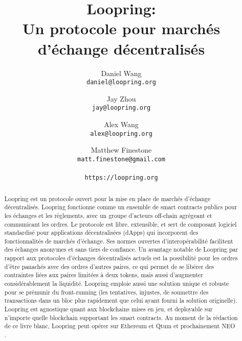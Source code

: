 \documentclass[UTF8,nofonts]{article}
\title{\textbf{Loopring:}\\\textbf{Un protocole pour marchés d'échange décentralisés}}
\author{
  Daniel Wang\\
  \texttt{daniel@loopring.org}\\
  \and
  	Jay Zhou\\
  	\texttt{jay@loopring.org}\\
  	\and
  	Alex Wang\\
  	\texttt{alex@loopring.org}\\
  	\and
  	Matthew Finestone\\
  	\texttt{matt.finestone@gmail.com}\\ 
  \\
  \texttt{https://loopring.org}
 }
\begin{document}
\maketitle


\begin{abstract}
Loopring est un protocole ouvert pour la mise en place de marchés d'échange décentralisés. Loopring fonctionne comme un ensemble de smart contracts publics pour les échanges et les règlements, avec un groupe d'acteurs off-chain agrégeant et communicant les ordres. Le protocole est libre, extensible, et sert de composant logiciel standardisé pour applications décentralisées (dApps) qui incorporent des fonctionnalités de marchés d'échange. Ses normes ouvertes d'interopérabilité facilitent des échanges anonymes et sans tiers de confiance. Un avantage notable de Loopring par rapport aux protocoles d'échanges décentralisés actuels est la possibilité pour les ordres d'être panachés avec des ordres d'autres paires, ce qui permet de se libérer des contraintes liées aux paires limitées à deux tokens, mais aussi d'augmenter considérablement la liquidité. Loopring emploie aussi une solution unique et robuste pour se prémunir du front-running (les tentatives, injustes, de soumettre des transactions dans un bloc plus rapidement que celui ayant fourni la solution originelle). Loopring est agnostique quant aux blockchains mises en jeu, et deployable sur n'importe quelle blockchain supportant les smart contracts. Au moment de la rédaction de ce livre blanc, Loopring peut opérer sur Ethereum \cite{buterin2017ethereum} \cite{wood2014ethereum} et Qtum \cite{dai2017smart} et prochainement NEO \cite{atterlonn2018distributed}.
\end{abstract}
\end{document}
